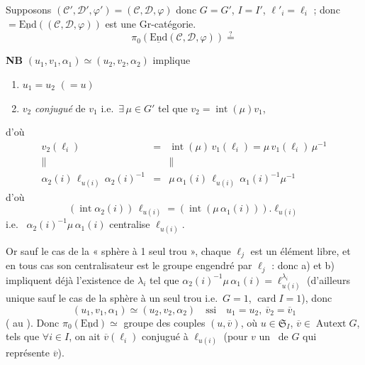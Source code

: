 \documentclass[11pt,a4paper]{article}
\begin{document}

Supposons $(\mathcal{C}', \mathcal{D}', \varphi') = (\mathcal{C}, \mathcal{D},
\varphi)$ donc $G = G'$, $I = I'$, $\ell'_i = \ell_i$ ; donc
$= \underline{\mathrm{End}}((\mathcal{C}, \mathcal{D}, \varphi))$ est une Gr-catégorie.
\[
  \pi_0(\underline{\mathrm{End}}(\mathcal{C}, \mathcal{D}, \varphi))
  \overset{?}{=}
\]

\textbf{NB} \quad $(u_1, v_1, \alpha_1) \simeq (u_2, v_2, \alpha_2)$
\struck{\ill{}} implique
\begin{enumerate}
  \item[a)] $u_1 = u_2$ $(= u)$
  \item[b)] $v_2$ \emph{conjugué} de $v_1$ i.e.\ $\exists\, \mu \in G'$ tel
  que $v_2 = \operatorname{int}(\mu) v_1$,
\end{enumerate}
d'où
\[
  \begin{array}{rcl}
    v_2(\ell_i) & = & \operatorname{int}(\mu)\, v_1(\ell_i) = \mu\, v_1(\ell_i)\, \mu^{-1} \\
    \| & & \| \\
    \alpha_2(i)\, \ell_{u(i)}\, \alpha_2(i)^{-1} & = & \mu\, \alpha_1(i)\, \ell_{u(i)}\, \alpha_1(i)^{-1} \mu^{-1}
  \end{array}
\]
d'où
\[
  (\operatorname{int} \alpha_2(i))\, \ell_{u(i)} =
  (\operatorname{int}(\mu\, \alpha_1(i))) . \ell_{u(i)}
\]
i.e.\  $\alpha_2(i)^{-1} \mu\, \alpha_1(i)$ centralise
$\ell_{u(i)}$.

Or sauf le cas de la « sphère à 1 seul trou », chaque $\ell_j$ est un élément
libre, et \struck{\ill{}} en tous cas son centralisateur est le groupe engendré par
$\ell_j$ :  donc a) et b) impliquent déjà
l'existence de $\lambda_i$ tel que
$\alpha_2(i)^{-1} \mu\, \alpha_1(i) = \ell_{u(i)}^{\lambda_i}$ (d'ailleurs
unique sauf le cas de la sphère à un seul trou i.e.\ $G = 1$,
$\operatorname{card} I = 1$), donc
\[
  (u_1, v_1, \alpha_1) \simeq (u_2, v_2, \alpha_2) \quad \text{ssi} \quad
  u_1 = u_2 ,\ \overline{v}_2 = \overline{v}_1
\]
(\ill{} au  \ill{}). Donc
$\pi_0(\underline{\mathrm{End}}) \simeq$ groupe des couples
$(u, \overline{v})$, où $u \in \mathfrak{S}_I$,
$\overline{v} \in \operatorname{Autext} G$, tels que $\forall i \in I$, on
ait $\overline{v}(\ell_i)$ conjugué à $\ell_{u(i)}$ (pour $v$ un
\ de $G$ qui représente $\overline{v}$).
\end{document}

